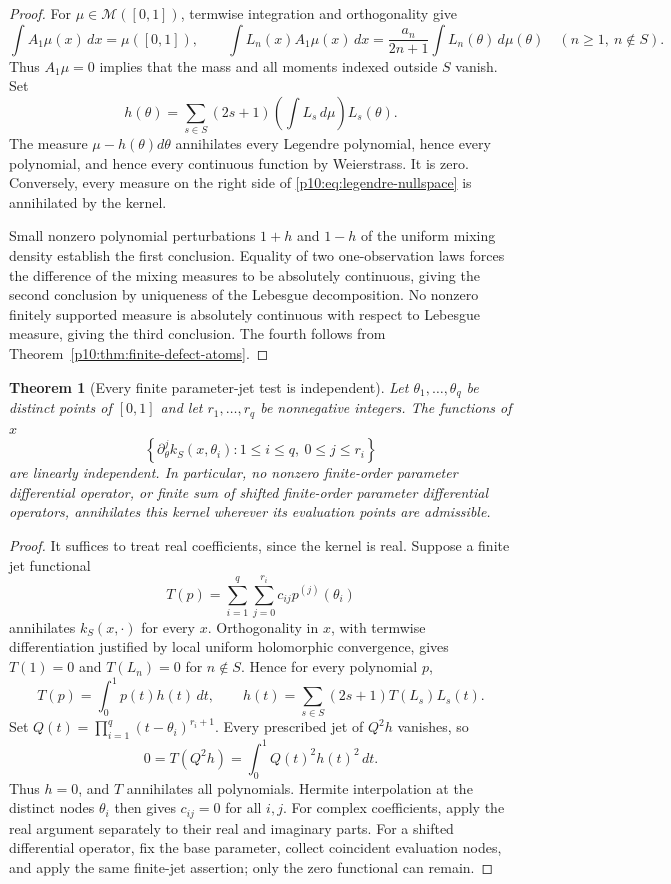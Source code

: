 \documentclass[11pt,letterpaper]{article}
\newtheorem{theorem}{Theorem}[section]
\theoremstyle{definition}
\theoremstyle{remark}
\newcommand{\1}{\mathbf 1}
\begin{document}
\begin{proof}
For $\mu\in\mathcal M([0,1])$, termwise integration and orthogonality give
\[
 \int A_1\mu(x)\,dx=\mu([0,1]),\qquad
 \int L_n(x)A_1\mu(x)\,dx
       =\frac{a_n}{2n+1}\int L_n(\theta)\,d\mu(\theta)
       \quad(n\geq1,\ n\notin S).
\]
Thus $A_1\mu=0$ implies that the mass and all moments indexed outside $S$
vanish.  Set
\[
 h(\theta)=\sum_{s\in S}(2s+1)
                  \left(\int L_s\,d\mu\right)L_s(\theta).
\]
The measure $\mu-h(\theta)d\theta$ annihilates every Legendre polynomial,
hence every polynomial, and hence every continuous function by Weierstrass.
It is zero.  Conversely, every measure on the right side of
\eqref{p10:eq:legendre-nullspace} is annihilated by the kernel.

Small nonzero polynomial perturbations $1+h$ and $1-h$ of the uniform
mixing density establish the first conclusion.  Equality of two
one-observation laws forces the difference of the mixing measures to be
absolutely continuous, giving the second conclusion by uniqueness of the
Lebesgue decomposition.  No nonzero finitely supported measure is
absolutely continuous with respect to Lebesgue measure, giving the third
conclusion.  The fourth follows from
Theorem~\ref{p10:thm:finite-defect-atoms}.
\end{proof}

\begin{theorem}[Every finite parameter-jet test is independent]
\label{p10:thm:legendre-jet-independence}
Let $\theta_1,\ldots,\theta_q$ be distinct points of $[0,1]$ and let
$r_1,\ldots,r_q$ be nonnegative integers.  The functions of $x$
\[
 \left\{\partial_\theta^j k_S(x,\theta_i):
                   1\leq i\leq q,\ 0\leq j\leq r_i\right\}
\]
are linearly independent.  In particular, no nonzero finite-order
parameter differential operator, or finite sum of shifted finite-order
parameter differential operators, annihilates this kernel wherever its
evaluation points are admissible.
\end{theorem}

\begin{proof}
It suffices to treat real coefficients, since the kernel is real.
Suppose a finite jet functional
\[
 T(p)=\sum_{i=1}^q\sum_{j=0}^{r_i} c_{ij}p^{(j)}(\theta_i)
\]
annihilates $k_S(x,\cdot)$ for every $x$.  Orthogonality in $x$, with
termwise differentiation justified by local uniform holomorphic
convergence, gives $T(1)=0$ and $T(L_n)=0$ for $n\notin S$.  Hence for
every polynomial $p$,
\[
 T(p)=\int_0^1 p(t)h(t)\,dt,
 \qquad h(t)=\sum_{s\in S}(2s+1)T(L_s)L_s(t).
\]
Set $Q(t)=\prod_{i=1}^q(t-\theta_i)^{r_i+1}$.  Every prescribed jet of
$Q^2h$ vanishes, so
\[
 0=T(Q^2h)=\int_0^1 Q(t)^2h(t)^2\,dt.
\]
Thus $h=0$, and $T$ annihilates all polynomials.  Hermite interpolation at
the distinct nodes $\theta_i$ then gives $c_{ij}=0$ for all $i,j$.
For complex coefficients, apply the real argument separately to their
real and imaginary parts.  For a shifted differential operator, fix the
base parameter, collect coincident evaluation nodes, and apply the same
finite-jet assertion; only the zero functional can remain.
\end{proof}
\end{document}
